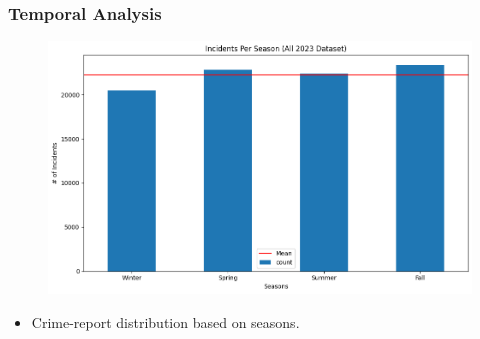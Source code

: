\documentclass{beamer}
\begin{document}

\begin{frame}
    \frametitle{Temporal Analysis}
    \begin{figure}
        \flushleft
        \includegraphics[width=1\linewidth]{Figures/Incidents Per Season (All 2023 Dataset).png}
    \end{figure}
    {\scriptsize %
    \begin{itemize}
        \item  Crime-report distribution based on seasons.
    \end{itemize}
    }
\end{frame}


\end{document}
